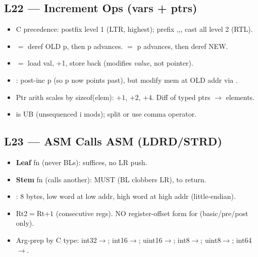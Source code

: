 \subsection{L22 --- Increment Ops (vars + ptrs)}
\begin{itemize}
\item C precedence: postfix \asm{++} level 1 (LTR, highest); prefix \asm{++},\asm{*},\asm{\&}, cast all level 2 (RTL).
\item {} $=$ deref OLD p, then p advances.  $=$ p advances, then deref NEW.
\item {} $=$ load val, +1, store back (modifies \emph{value}, not pointer).
\item {}: post-inc p (so p now points past), but modify mem at OLD addr via \asm{[r0,\#-1]}.
\item Ptr arith scales by sizeof(elem): $+1$, $+2$, $+4$. Diff of typed ptrs $\to$ elements.
\item {} is UB (unsequenced i mods); split or use comma operator.
\end{itemize}

\subsection{L23 --- ASM Calls ASM (LDRD/STRD)}
\begin{itemize}
\item \textbf{Leaf} fn (never BLs):  suffices, no LR push.
\item \textbf{Stem} fn (calls another): MUST  (BL clobbers LR),  to return.
\item {}: 8 bytes, low word at low addr, high word at high addr (little-endian).
\item Rt2$=$Rt$+1$ (consecutive regs). NO register-offset form for  (basic/pre/post only).
\item Arg-prep by C type: int32$\to$; int16$\to$; uint16$\to$; int8$\to$; uint8$\to$; int64$\to$.
\end{itemize}

